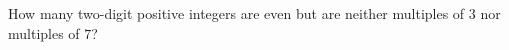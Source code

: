 How many two-digit positive integers are even but are neither multiples of $3$ nor multiples of $7$?

